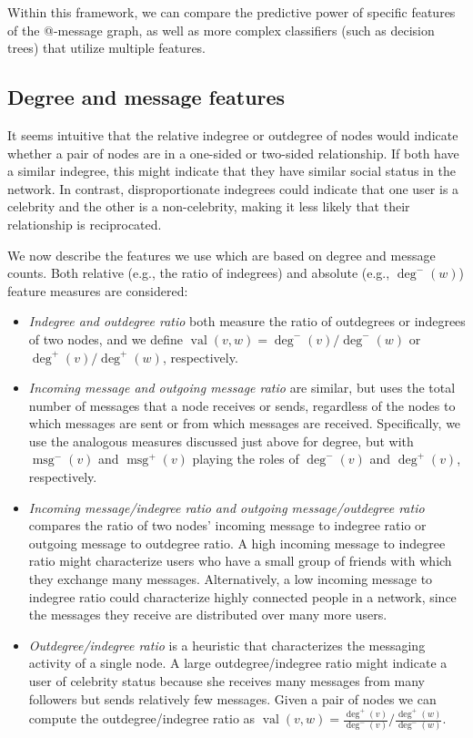 \documentclass[conference]{IEEEtran}
\begin{document}
Within this framework, we can compare the predictive power of specific features of the @-message graph, as well as more complex classifiers (such as decision trees) that utilize multiple features.

\subsection{Degree and message features}
It seems intuitive that the relative indegree or outdegree of nodes would indicate whether a pair of nodes are in a one-sided or two-sided relationship. 
If both have a similar indegree, this might indicate that they have similar social status in the network. 
In contrast, disproportionate indegrees could indicate that one user is a celebrity and the other is a non-celebrity, making it less likely that their relationship is reciprocated.

We now describe the features we use which are based on degree and message counts.  
Both relative (e.g., the ratio of indegrees) and absolute (e.g., $\deg^-(w)$) feature measures are considered:

\begin{itemize}
\item \emph{Indegree and outdegree ratio} both measure the ratio of outdegrees or indegrees of two nodes, and we define $\operatorname{val}(v,w) = \deg^-(v)/\deg^-(w)$ or $\deg^+(v)/\deg^+(w)$, respectively.

\item \emph{Incoming message and outgoing message ratio} are similar,
but uses the total number of messages that a node receives or
sends, regardless of the nodes to which messages are sent or from which messages are received.
Specifically, we use the analogous measures
discussed just above for degree, but with 
$\operatorname{msg}^-(v)$ and $\operatorname{msg}^+(v)$ playing
the roles of $\deg^-(v)$ and $\deg^+(v)$, respectively.

\item \emph{Incoming message/indegree ratio and outgoing message/outdegree ratio} compares the ratio of two nodes' incoming message to indegree ratio or outgoing message to outdegree ratio. 
A high incoming message to indegree ratio might characterize users who have a small group of friends with which they exchange many messages.
Alternatively, a low incoming message to indegree ratio could characterize highly connected 
people in a network, since the messages they receive are distributed over many more users.

\item \emph{Outdegree/indegree ratio} is a heuristic that characterizes the messaging activity of a single node.  
A large outdegree/indegree ratio might indicate a user of celebrity status because she receives many messages from many followers  
but sends relatively few messages. 
Given a pair of nodes we can compute the outdegree/indegree ratio as $\operatorname{val}(v,w) = \frac{\deg^+(v)}{\deg^-(v)} / \frac{\deg^+(w)}{\deg^-(w)}$.
\end{itemize}
\end{document}
